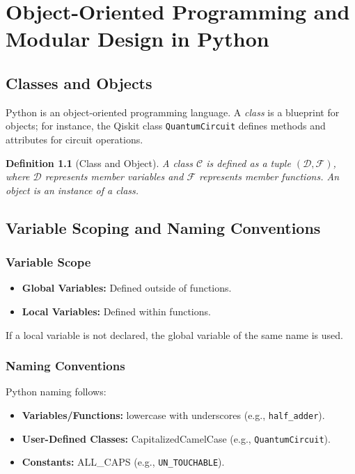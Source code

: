\documentclass[12pt]{book}
\newtheorem{definition}{Definition}[chapter]
\theoremstyle{remark}
\begin{document}
	\chapter{Object-Oriented Programming and Modular Design in Python}
	\section{Classes and Objects}
	Python is an object-oriented programming language. A \emph{class} is a blueprint for objects; for instance, the Qiskit class \texttt{QuantumCircuit} defines methods and attributes for circuit operations.
	
	\begin{definition}[Class and Object]
		A class \(\mathcal{C}\) is defined as a tuple \((\mathcal{D}, \mathcal{F})\), where \(\mathcal{D}\) represents member variables and \(\mathcal{F}\) represents member functions. An object is an instance of a class.
	\end{definition}
	
	\section{Variable Scoping and Naming Conventions}
	\subsection{Variable Scope}
	\begin{itemize}
		\item \textbf{Global Variables:} Defined outside of functions.
		\item \textbf{Local Variables:} Defined within functions.
	\end{itemize}
	If a local variable is not declared, the global variable of the same name is used.
	
	\subsection{Naming Conventions}
	Python naming follows:
	\begin{itemize}
		\item \textbf{Variables/Functions:} lowercase with underscores (e.g., \texttt{half\_adder}).
		\item \textbf{User-Defined Classes:} CapitalizedCamelCase (e.g., \texttt{QuantumCircuit}).
		\item \textbf{Constants:} ALL\_CAPS (e.g., \texttt{UN\_TOUCHABLE}).
	\end{itemize}
	
\end{document}
